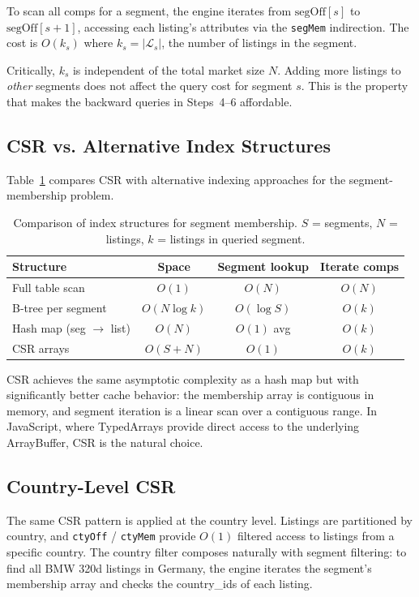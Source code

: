 \documentclass[11pt,a4paper,twoside]{book}
\begin{document}
To scan all comps for a segment, the engine iterates from $\text{segOff}[s]$ to
$\text{segOff}[s+1]$, accessing each listing's attributes via the \texttt{segMem} indirection.
The cost is $O(k_s)$ where $k_s = |\mathcal{L}_s|$, the number of listings in the segment.

Critically, $k_s$ is independent of the total market size $N$. Adding more listings to
\textit{other} segments does not affect the query cost for segment $s$. This is the property
that makes the backward queries in Steps~4--6 affordable.

\subsection{CSR vs. Alternative Index Structures}

Table~\ref{tab:indexcompare} compares CSR with alternative indexing approaches for the
segment-membership problem.

\begin{table}[H]
\centering
\caption{Comparison of index structures for segment membership. $S$ = segments, $N$ = listings,
         $k$ = listings in queried segment.}
\label{tab:indexcompare}
\begin{tabular}{@{}lccc@{}}
\toprule
\textbf{Structure} & \textbf{Space} & \textbf{Segment lookup} & \textbf{Iterate comps} \\
\midrule
Full table scan  & $O(1)$   & $O(N)$ & $O(N)$ \\
B-tree per segment & $O(N \log k)$ & $O(\log S)$ & $O(k)$ \\
Hash map (seg $\to$ list) & $O(N)$ & $O(1)$ avg & $O(k)$ \\
CSR arrays       & $O(S + N)$ & $O(1)$ & $O(k)$ \\
\bottomrule
\end{tabular}
\end{table}

CSR achieves the same asymptotic complexity as a hash map but with significantly better
cache behavior: the membership array is contiguous in memory, and segment iteration is a
linear scan over a contiguous range. In JavaScript, where TypedArrays provide direct access
to the underlying ArrayBuffer, CSR is the natural choice.

\subsection{Country-Level CSR}

The same CSR pattern is applied at the country level. Listings are partitioned by country,
and \texttt{ctyOff} / \texttt{ctyMem} provide $O(1)$ filtered access to listings from a
specific country. The country filter composes naturally with segment filtering: to find all
BMW 320d listings in Germany, the engine iterates the segment's membership array and checks
the country\_ids of each listing.
\end{document}
